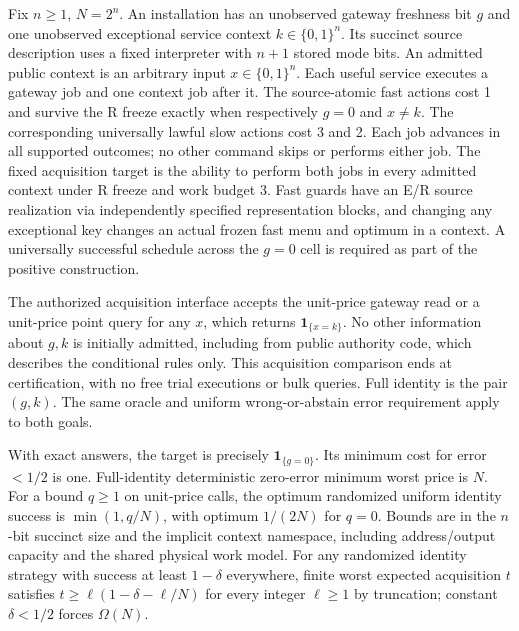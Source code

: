 \begin{theorem}\label{ext:t07k}

Fix \(n\ge 1\), \(N=2^n\). An installation has an unobserved gateway freshness bit \(g\) and one unobserved exceptional service context \(k\in\{0,1\}^n\). Its succinct source description uses a fixed interpreter with \(n+1\) stored mode bits. An admitted public context is an arbitrary input \(x\in\{0,1\}^n\). Each useful service executes a gateway job and one context job after it. The source-atomic fast actions cost 1 and survive the R freeze exactly when respectively \(g=0\) and \(x\ne k\). The corresponding universally lawful slow actions cost 3 and 2. Each job advances in all supported outcomes; no other command skips or performs either job. The fixed acquisition target is the ability to perform both jobs in every admitted context under R freeze and work budget 3. Fast guards have an E/R source realization via independently specified representation blocks, and changing any exceptional key changes an actual frozen fast menu and optimum in a context. A universally successful schedule across the \(g=0\) cell is required as part of the positive construction.

The authorized acquisition interface accepts the unit-price gateway read or a unit-price point query for any \(x\), which returns \(\mathbf 1_{\{x=k\}}\). No other information about \(g,k\) is initially admitted, including from public authority code, which describes the conditional rules only. This acquisition comparison ends at certification, with no free trial executions or bulk queries. Full identity is the pair \((g,k)\). The same oracle and uniform wrong-or-abstain error requirement apply to both goals.

With exact answers, the target is precisely \(\mathbf 1_{\{g=0\}}\). Its minimum cost for error \(<1/2\) is one. Full-identity deterministic zero-error minimum worst price is \(N\). For a bound \(q\ge1\) on unit-price calls, the optimum randomized uniform identity success is \(\min(1,q/N)\), with optimum \(1/(2N)\) for \(q=0\). Bounds are in the \(n\)-bit succinct size and the implicit context namespace, including address/output capacity and the shared physical work model. For any randomized identity strategy with success at least \(1-\delta\) everywhere, finite worst expected acquisition \(t\) satisfies \(t\ge \ell(1-\delta-\ell/N)\) for every integer \(\ell\ge1\) by truncation; constant \(\delta<1/2\) forces \(\Omega(N)\).


\end{theorem}
